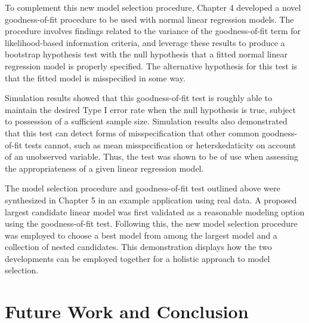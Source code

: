 		To complement this new model selection procedure, Chapter 4 developed a novel goodness-of-fit procedure to be used with normal linear regression models.
		The procedure involves findings related to the variance of the goodness-of-fit term for likelihood-based information criteria, and leverage these
		results to produce a bootstrap hypothesis test with the null hypothesis that a fitted normal linear regression model is properly specified. The alternative
		hypothesis for this test is that the fitted model is misspecified in some way.

		Simulation results showed that this goodness-of-fit test is roughly able to maintain the desired Type I error rate when the null hypothesis is true, subject
		to possession of a sufficient sample size. Simulation results also demonstrated that this test can detect forms of misspecification that other common
		goodness-of-fit tests cannot, such as mean misspecification or heterskedaticity on account of an unobserved variable. Thus, the test was shown to be of use
		when assessing the appropriateness of a given linear regression model.

		The model selection procedure and goodness-of-fit test outlined above were synthesized in Chapter 5 in an example application using real data. A proposed
		largest candidate linear model was first validated as a reasonable modeling option using the goodness-of-fit test. Following this, the new model selection
		procedure was employed to choose a best model from among the largest model and a collection of nested candidates. This demonstration displays how the
		two developments can be employed together for a holistic approach to model selection.

		\section{Future Work and Conclusion}
		
		
		